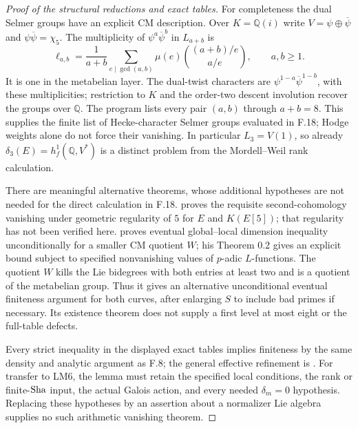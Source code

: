 \begin{proof}[Proof of the structural reductions and exact tables]
For completeness the dual Selmer groups have an explicit CM description.
Over $K=\mathbb Q(i)$ write $V=\psi\oplus\overline\psi$ and
$\psi\overline\psi=\chi_5$. The multiplicity of
$\psi^a\overline\psi^b$ in $L_{a+b}$ is
\[
 \ell_{a,b}=\frac1{a+b}
   \sum_{e\mid\gcd(a,b)}\mu(e)
                  \binom{(a+b)/e}{a/e},\qquad a,b\ge1.
\]
It is one in the metabelian layer. The dual-twist characters are
$\psi^{1-a}\overline\psi^{1-b}$, with these multiplicities;
restriction to $K$ and the order-two descent involution recover the
groups over $\mathbb Q$. The program lists every pair $(a,b)$ through
$a+b=8$. This supplies the finite list of Hecke-character Selmer groups
evaluated in F.18; Hodge weights alone do not force their vanishing.
In particular $L_3=V(1)$, so already
$\delta_3(E)=h_f^1(\mathbb Q,V^*)$ is a distinct problem from
the Mordell--Weil rank calculation.

There are meaningful alternative theorems, whose additional hypotheses
are not needed for the direct calculation in F.18.
\citet[Definition 2.2 and Corollary 2.9]{FE_Bars2007}
proves the requisite second-cohomology vanishing under geometric
regularity of $5$ for $E$ and $K(E[5])$; that regularity has not been
verified here. \citet[Theorem 0.1]{FE_Kim2010CM} proves eventual
global--local dimension inequality unconditionally for a smaller CM
quotient $W$; his Theorem 0.2 gives an explicit bound subject to
specified nonvanishing values of $p$-adic $L$-functions. The quotient
$W$ kills the Lie bidegrees with both entries at least two and is a
quotient of the metabelian group. Thus it gives an alternative
unconditional eventual finiteness argument for both curves, after
enlarging $S$ to include bad primes if necessary. Its existence theorem
does not supply a first level at most eight or the full-table defects.

Every strict inequality in the displayed exact tables implies finiteness
by the same density and analytic argument as F.8; the general effective
refinement is \citet[Theorem 6.2.1(A),(B), and \S6.3]{FE_Betts2023}.
For transfer to LM6, the lemma must retain the specified local
conditions, the rank or finite-$\mathrm{Sha}$ input, the actual Galois action,
and every needed $\delta_m=0$ hypothesis. Replacing these hypotheses
by an assertion about a normalizer Lie algebra supplies no such
arithmetic vanishing theorem.
\end{proof}
